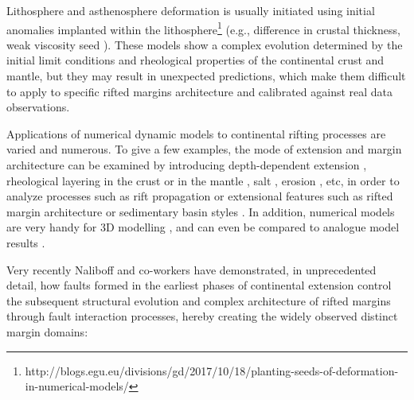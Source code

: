 Lithosphere and asthenosphere deformation is usually initiated using initial anomalies implanted within the 
lithosphere\footnote{http://blogs.egu.eu/divisions/gd/2017/10/18/planting-seeds-of-deformation-in-numerical-models/} 
(e.g., difference in crustal thickness, weak viscosity seed \cite{vanw05,dyrm07}). These models show a complex 
evolution determined by the initial limit conditions and rheological properties of the continental crust and mantle, 
but they may result in unexpected predictions, which make them difficult to apply to specific rifted margins architecture 
and calibrated against real data observations.

Applications of numerical dynamic models to continental rifting processes are varied and numerous. To give a few examples, 
the mode of extension and margin architecture can be examined by introducing depth-dependent extension \cite{hube08,hube11}, 
rheological layering in the crust \cite{wiwg05} or in the mantle \cite{lige14}, salt \cite{albs10,albe15}, 
erosion \cite{bupo01}, etc, in order to analyze processes such as rift propagation \cite{vabl05} or extensional 
features such as rifted margin architecture \cite{wulc15} or sedimentary basin styles \cite{buhb08}. In addition, 
numerical models are very handy for 3D modelling \cite{alht11,alht12,alhf13}, and can even be compared to analogue model results \cite{bube06}. 

Very recently Naliboff and co-workers have demonstrated, in unprecedented detail, how faults formed in the 
earliest phases of continental extension control the subsequent structural evolution and complex architecture of 
rifted margins through fault interaction processes, hereby creating the widely observed distinct margin domains:

